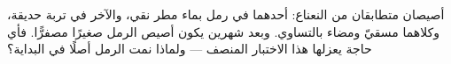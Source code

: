 \begin{exercise}[$\star\star\star$]\label{exo:g4:what-plants-need:11}
أصيصان متطابقان من النعناع: أحدهما في رمل بماء مطر نقي، والآخر في
تربة حديقة، وكلاهما مسقيّ ومضاء بالتساوي. وبعد شهرين يكون أصيص
الرمل صغيرًا مصفرًّا. فأي حاجة يعزلها هذا الاختبار المنصف --- ولماذا
نمت  الرمل أصلًا في البداية؟
\end{exercise}
